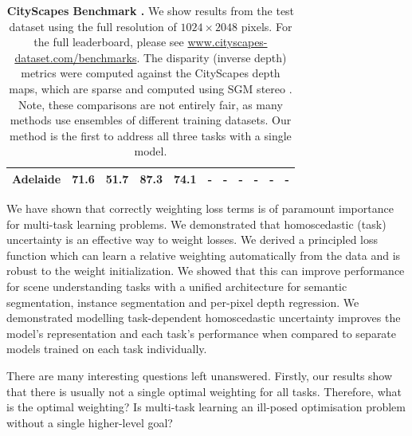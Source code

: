 {\begin{landscape}
\begin{table}[t]
{\begin{tabular}{l|c|c|c|c|c|c|c|c|c|c}
			Adelaide \cite{lin2015efficient} & 71.6 & 51.7 & 87.3 & 74.1 &-&-&-&-&-&-\\%
            \bottomrule
		\end{tabular}}
	\caption[CityScapes Benchmark.]{\textbf{CityScapes Benchmark \cite{Cordts2016Cityscapes}.} We show results from the test dataset using the full resolution of $1024\times2048$ pixels. For the full leaderboard, please see \url{www.cityscapes-dataset.com/benchmarks}. The disparity (inverse depth) metrics were computed against the CityScapes depth maps, which are sparse and computed using SGM stereo \cite{hirschmuller2005accurate}. Note, these comparisons are not entirely fair, as many methods use ensembles of different training datasets. Our method is the first to address all three tasks with a single model.}
	\label{tbl:benchmarks}
\end{table}
\end{landscape}
\clearpage%
}

We have shown that correctly weighting loss terms is of paramount importance for multi-task learning problems. We demonstrated that homoscedastic (task) uncertainty is an effective way to weight losses. We derived a principled loss function which can learn a relative weighting automatically from the data and is robust to the weight initialization. We showed that this can improve performance for scene understanding tasks with a unified architecture for semantic segmentation, instance segmentation and per-pixel depth regression. We demonstrated modelling task-dependent homoscedastic uncertainty improves the model's representation and each task's performance when compared to separate models trained on each task individually.

There are many interesting questions left unanswered. Firstly, our results show that there is usually not a single optimal weighting for all tasks. Therefore, what is the optimal weighting? Is multi-task learning an ill-posed optimisation problem without a single higher-level goal?

